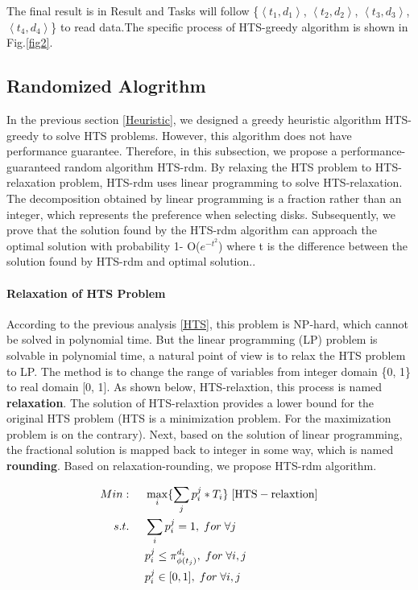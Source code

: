 \documentclass[conference]{IEEEtran}
\begin{document}
The final result is in Result and  Tasks will follow \{$\left \langle t_1, d_{1}\right \rangle$, $\left \langle t_2, d_{2}\right \rangle$,  $\left \langle t_3, d_{3}\right \rangle$, $\left \langle t_4, d_{4}\right \rangle$\} to read data.The specific process of HTS-greedy algorithm is shown in Fig.\ref{fig2}.

\subsection{Randomized Alogrithm}\label{Randomized}

In the previous section \ref{Heuristic}, we designed a greedy heuristic algorithm HTS-greedy to solve HTS problems. However, this algorithm does not have performance guarantee. Therefore, in this subsection, we propose a performance-guaranteed random algorithm HTS-rdm. By relaxing the HTS problem to HTS-relaxation problem, HTS-rdm uses linear programming to solve HTS-relaxation. The decomposition obtained by linear programming is a fraction rather than an integer, which represents the preference when selecting disks. Subsequently, we prove that the solution found by the HTS-rdm algorithm can approach the optimal solution with probability 1- O($e^{-t^2}$) where t is the difference between the solution found by HTS-rdm and optimal solution..

\paragraph{\textbf{Relaxation of HTS Problem}} According to the previous analysis \ref{HTS}, this problem is NP-hard, which cannot be solved in polynomial time. But the linear programming (LP) problem is solvable in polynomial time, a natural point of view is to relax the HTS problem to LP. The method is to change the range of variables from integer domain \{0, 1\} to real domain [0, 1]. As shown below, HTS-relaxtion, this process is named \textbf{relaxation}. The solution of HTS-relaxtion provides a lower bound for the original HTS problem (HTS is a minimization problem. For the maximization problem is on the contrary). Next, based on the solution of linear programming, the fractional solution is mapped back to integer in some way, which is named \textbf{rounding}. Based on relaxation-rounding, we propose HTS-rdm algorithm.

 \begin{align}
 Min:&\;\;\;\;\;\max\limits_{i}\{\sum_{j}p_i^j*T_i\}\;[\rm{HTS-relaxtion}]\nonumber\\
 s.t. 
 &\;\;\;\;\;\sum_{i}p_i^j = 1,\;for\;\forall j\nonumber\\
 &\;\;\;\;\;p_i^j \leq \pi_{\phi(t_j)}^{d_i},\;for\;\forall i,j\nonumber\\
 &\;\;\;\;\;p_i^j \in[0, 1],\;for\;\forall i,j\nonumber
 \end{align}
 
\end{document}

